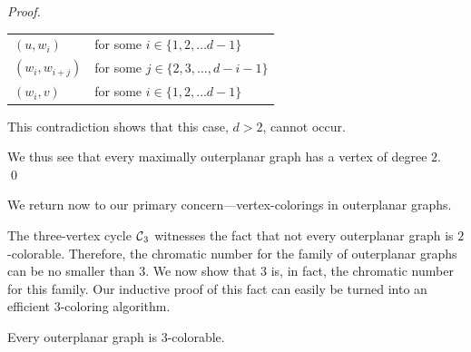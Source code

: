 \begin{proof}
\begin{enumerate}
\hspace*{.2in}\begin{tabular}{ll}
$(u, w_i)$
 & for some $i \in \{1, 2, \ldots d-1\}$ \\ 
$(w_i, w_{i+j})$
 & for some $j \in \{ 2, 3, \ldots, d-i-1\}$ \\
$(w_i, v)$
 & for some $i \in \{1, 2, \ldots d-1\}$
\end{tabular}

\smallskip

This contradiction shows that this case, $d>2$, cannot occur.
\end{enumerate}
We thus see that every maximally outerplanar graph has a vertex of degree $2$.  \qed
\end{proof}

\medskip

We return now to our primary concern---vertex-colorings in outerplanar graphs.

\medskip


The three-vertex cycle $\mbox{$\cal C$}_3$ witnesses the fact that not every outerplanar graph is $2$-colorable. Therefore, the chromatic number for the family of outerplanar graphs can be no smaller than $3$.  We now show that $3$ is, in fact, the chromatic number for this family.  Our inductive proof of this fact can easily be turned into an efficient $3$-coloring algorithm.

\begin{prop}
\label{thm:OP-3-colorability}
Every outerplanar graph is $3$-colorable.
\end{prop}

